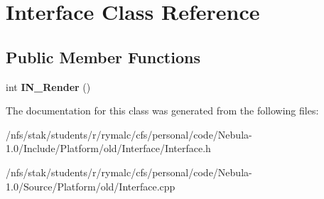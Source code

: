 \hypertarget{classInterface}{
\section{Interface Class Reference}
\label{classInterface}
}
\subsection*{Public Member Functions}
\begin{DoxyCompactItemize}
\item 
\hypertarget{classInterface_af6374650c75de1fdba49d5ced9f3a388}{
int {\bfseries IN\_\-Render} ()}
\label{classInterface_af6374650c75de1fdba49d5ced9f3a388}

\end{DoxyCompactItemize}


The documentation for this class was generated from the following files:\begin{DoxyCompactItemize}
\item 
/nfs/stak/students/r/rymalc/cfs/personal/code/Nebula-\/1.0/Include/Platform/old/Interface/Interface.h\item 
/nfs/stak/students/r/rymalc/cfs/personal/code/Nebula-\/1.0/Source/Platform/old/Interface.cpp\end{DoxyCompactItemize}
